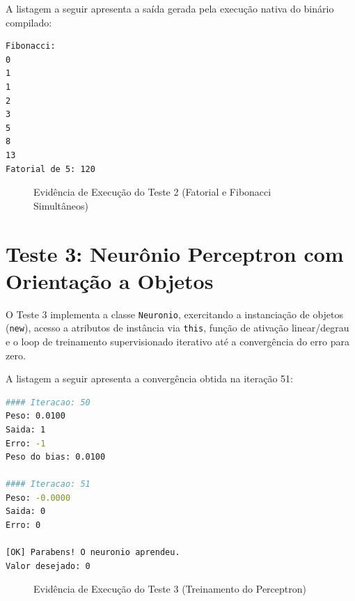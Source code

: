 A listagem a seguir apresenta a saída gerada pela execução nativa do binário compilado:

\begin{lstlisting}[language=bash, caption={Saida da execucao nativa do Teste 2}]
Fibonacci:
0
1
1
2
3
5
8
13
Fatorial de 5: 120
\end{lstlisting}

\begin{figure}[htbp]
    \centering
    \caption{Evidência de Execução do Teste 2 (Fatorial e Fibonacci Simultâneos)}
    \label{fig:teste2_print}
\end{figure}

\section{Teste 3: Neurônio Perceptron com Orientação a Objetos}
O Teste 3 implementa a classe \texttt{Neuronio}, exercitando a instanciação de objetos (\texttt{new}), acesso a atributos de instância via \texttt{this}, função de ativação linear/degrau e o loop de treinamento supervisionado iterativo até a convergência do erro para zero.

A listagem a seguir apresenta a convergência obtida na iteração 51:

\begin{lstlisting}[language=bash, caption={Trecho final do treinamento do Perceptron (Teste 3)}]
#### Iteracao: 50
Peso: 0.0100
Saida: 1
Erro: -1
Peso do bias: 0.0100

#### Iteracao: 51
Peso: -0.0000
Saida: 0
Erro: 0

[OK] Parabens! O neuronio aprendeu.
Valor desejado: 0
\end{lstlisting}

\begin{figure}[htbp]
    \centering
    \caption{Evidência de Execução do Teste 3 (Treinamento do Perceptron)}
    \label{fig:teste3_print}
\end{figure}

